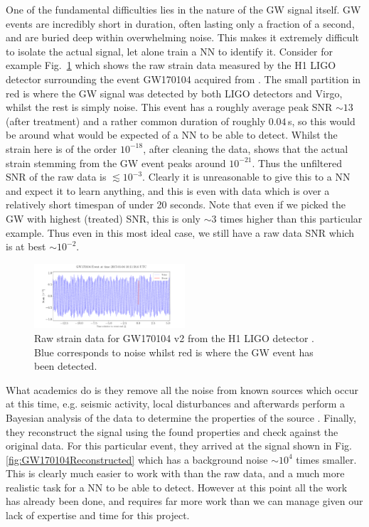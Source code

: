 \documentclass[%
reprint,
amsmath,amssymb,
aps,
]{revtex4-2}
\begin{document}
One of the fundamental difficulties lies in the nature of the GW signal itself. GW events are incredibly short in duration, often lasting only a fraction of a second, and are buried deep within overwhelming noise. This makes it extremely difficult to isolate the actual signal, let alone train a NN to identify it. Consider for example Fig.~\ref{fig:GW170104} which shows the raw strain data measured by the H1 LIGO detector surrounding the event GW170104 acquired from \cite{gwosc}. The small partition in red is where the GW signal was detected by both LIGO detectors and Virgo, whilst the rest is simply noise. This event has a roughly average peak SNR $\sim13$ (after treatment) and a rather common duration of roughly $0.04\,$s, so this would be around what would be expected of a NN to be able to detect. Whilst the strain here is of the order $10^{-18}$, after cleaning the data, \cite{LIGOScientific:2017bnn} shows that the actual strain stemming from the GW event peaks around $10^{-21}$. Thus the unfiltered SNR of the raw data is $\lesssim10^{-3}$. Clearly it is unreasonable to give this to a NN and expect it to learn anything, and this is even with data which is over a relatively short timespan of under 20 seconds. Note that even if we picked the GW with highest (treated) SNR, this is only $\sim3$ times higher than this particular example. Thus even in this most ideal case, we still have a raw data SNR which is at best $\sim10^{-2}$.

\begin{figure}[ht!]
	\includegraphics[width=0.5\textwidth]{Figures/GW170104GWEvent.pdf}
	\caption{Raw strain data for GW170104 v2 from the H1 LIGO detector \cite{gwosc}. Blue corresponds to noise whilst red is where the GW event has been detected.}
	\label{fig:GW170104}
\end{figure}

What academics do is they remove all the noise from known sources which occur at this time, e.g. seismic activity, local disturbances and afterwards perform a Bayesian analysis of the data to determine the properties of the source \cite{LIGOScientific:2017bnn}. Finally, they reconstruct the signal using the found properties and check against the original data. For this particular event, they arrived at the signal shown in Fig. \ref{fig:GW170104Reconstructed} which has a background noise $\sim10^{4}$ times smaller. This is clearly much easier to work with than the raw data, and a much more realistic task for a NN to be able to detect. However at this point all the work has already been done, and requires far more work than we can manage given our lack of expertise and time for this project.
\end{document}

